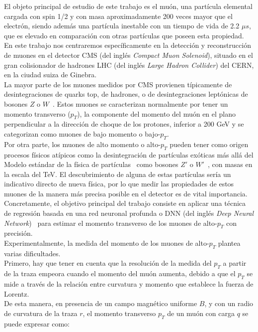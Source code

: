 
El objeto principal de estudio de este trabajo es el mu\'on, una part\'icula elemental cargada con spin 1/2 y con masa aproximadamente 200 veces mayor que el electr\'on, siendo adem\'as una part\'icula inestable con un tiempo de vida de 2.2 $\mu s$, que es elevado en comparaci\'on con otras part\'iculas que poseen esta propiedad. \\

En este trabajo nos centraremos espec\'ificamente en la detecci\'on y reconstrucci\'on de muones en el detector CMS (del ingl\'es \textit{Compact Muon Solenoid}), situado en el gran colisionador de hadrones LHC (del ingl\'es \textit{Large Hadron Collider}) del CERN, en la ciudad suiza de Ginebra. \\
La mayor parte de los muones medidos por CMS provienen t\'ipicamente de desintegraciones de quarks top, de hadrones, o de desintegraciones lept\'onicas de bosones $Z$ o $W$~\cite{PhysRevD.98.030001}. Estos muones se caracterizan normalmente por tener un momento transverso ($p_{T}$), la componente del momento del mu\'on en el plano perpendicular a la direcci\'on de choque de los protones, inferior a 200 GeV y se categorizan como muones de bajo momento o bajo-$p_{T}$. \\

Por otra parte, los muones de alto momento o alto-$p_{T}$ pueden tener como origen procesos f\'isicos at\'ipicos como la desintegraci\'on de part\'iculas ex\'oticas m\'as all\'a del Modelo est\'andar de la f\'isica de part\'iculas~\cite{gaillard1999standard} como bosones $Z'$ o $W'$~\cite{CMS-PAS-EXO-19-019,2017278}, con masas en la escala del TeV. El descubrimiento de alguna de estas part\'iculas ser\'ia un indicativo directo de nueva f\'isica, por lo que medir las propiedades de estos muones de la manera m\'as precisa posible en el detector es de vital importancia. Concretamente, el objetivo principal del trabajo consiste en aplicar una t\'ecnica de regresi\'on basada en una red neuronal profunda o DNN (del ingl\'es \textit{Deep Neural Network})~\cite{Schmidhuber:2015} para estimar el momento transverso de los muones de alto-$p_{T}$ con precisi\'on. \\

Experimentalmente, la medida del momento de los muones de alto-$p_{T}$ plantea varias dificultades. \\
Primero, hay que tener en cuenta que la resoluci\'on de la medida del $p_{T}$ a partir de la traza empeora cuando el momento del mu\'on aumenta, debido a que el $p_{T}$ se mide a trav\'es de la relaci\'on entre curvatura y momento que establece la fuerza de Lorentz.\\
De esta manera, en presencia de un campo magn\'etico uniforme $B$, y con un radio de curvatura de la traza $r$, el momento transverso $p_{T}$ de un mu\'on con carga $q$ se puede expresar como:


